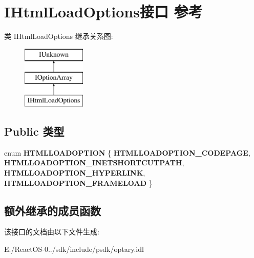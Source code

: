 \hypertarget{interface_i_html_load_options}{}\section{I\+Html\+Load\+Options接口 参考}
\label{interface_i_html_load_options}
类 I\+Html\+Load\+Options 继承关系图\+:\begin{figure}[H]
\begin{center}
\leavevmode
\includegraphics[height=3.000000cm]{interface_i_html_load_options}
\end{center}
\end{figure}
\subsection*{Public 类型}
\begin{DoxyCompactItemize}
\item 
\mbox{\label{interface_i_html_load_options_ac6281126b339f940aba1eeebb7c4881f}} 
enum {\bfseries H\+T\+M\+L\+L\+O\+A\+D\+O\+P\+T\+I\+ON} \{ {\bfseries H\+T\+M\+L\+L\+O\+A\+D\+O\+P\+T\+I\+O\+N\+\_\+\+C\+O\+D\+E\+P\+A\+GE}, 
{\bfseries H\+T\+M\+L\+L\+O\+A\+D\+O\+P\+T\+I\+O\+N\+\_\+\+I\+N\+E\+T\+S\+H\+O\+R\+T\+C\+U\+T\+P\+A\+TH}, 
{\bfseries H\+T\+M\+L\+L\+O\+A\+D\+O\+P\+T\+I\+O\+N\+\_\+\+H\+Y\+P\+E\+R\+L\+I\+NK}, 
{\bfseries H\+T\+M\+L\+L\+O\+A\+D\+O\+P\+T\+I\+O\+N\+\_\+\+F\+R\+A\+M\+E\+L\+O\+AD}
 \}
\end{DoxyCompactItemize}
\subsection*{额外继承的成员函数}


该接口的文档由以下文件生成\+:\begin{DoxyCompactItemize}
\item 
E\+:/\+React\+O\+S-\/0../sdk/include/psdk/optary.\+idl\end{DoxyCompactItemize}

